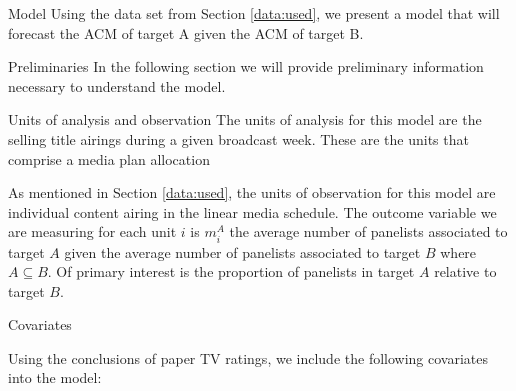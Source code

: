 \begin{chapter}{Model}
  Using the data set from Section \ref{data:used}, we present a model that will
  forecast the ACM of target A given the ACM of target B.

\begin{section}{Preliminaries}
  In the following section we will provide preliminary information necessary to
  understand the model.

  \begin{subsection}{Units of analysis and observation}
    The units of analysis for this model are the selling title airings during a given broadcast week.
    These are the units that comprise a media plan allocation

    As mentioned in Section \ref{data:used}, the units of observation for this model
    are individual content airing in the linear media schedule. The outcome
    variable we are measuring for each unit $i$ is $m_i^A$ the average number of panelists
    associated to target $A$ given the average number of panelists associated to target $B$
    where $A \subseteq B$. Of primary interest is the proportion of panelists in target $A$ relative to target $B$.

  \end{subsection}

  \begin{subsection}{Covariates}

  Using the conclusions of paper TV ratings, we include the following covariates into the model:


\end{subsection}
\end{section}
\end{chapter}
